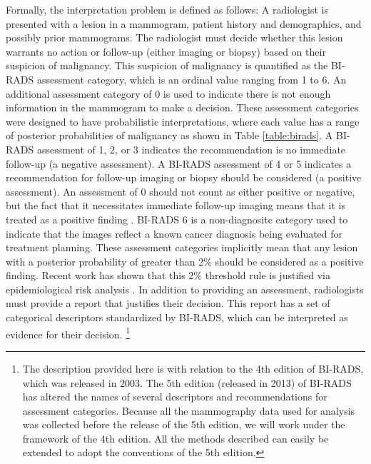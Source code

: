 Formally, the interpretation problem is defined as follows: A radiologist is presented with a lesion in a mammogram, patient history and demographics, and possibly prior mammograms. The radiologist must decide whether this lesion warrants no action or follow-up (either imaging or biopsy) based on their suspicion of malignancy. This suspicion of malignancy is quantified as the BI-RADS assessment category, which is an ordinal value ranging from 1 to 6. An additional assessment category of 0 is used to indicate there is not enough information in the mammogram to make a decision. These assessment categories were designed to have probabilistic interpretations, where each value has a range of posterior probabilities of malignancy as shown in Table \ref{table:birads}. A BI-RADS assessment of 1, 2, or 3 indicates the recommendation is no immediate follow-up (a negative assessment). A BI-RADS assessment of 4 or 5 indicates a recommendation for follow-up imaging or biopsy should be considered (a positive assessment). An assessment of 0 should not count as either positive or negative, but the fact that it necessitates immediate follow-up imaging means that it is treated as a positive finding \cite{Barlow:2004cy}. BI-RADS 6 is a non-diagnositc category used to indicate that the images reflect a known cancer diagnosis being evaluated for treatment planning. These assessment categories implicitly mean that any lesion with a posterior probability of greater than 2\% should be considered as a positive finding. Recent work has shown that this 2\% threshold rule is justified via epidemiological risk analysis \cite{Burnside:2012fk}. In addition to providing an assessment, radiologists must provide a report that justifies their decision. This report has a set of categorical descriptors standardized by BI-RADS, which can be interpreted as evidence for their decision.
\footnote{The description provided here is with relation to the 4th edition of BI-RADS, which was released in 2003. The 5th edition (released in 2013) of BI-RADS has altered the names of several descriptors and recommendations for assessment categories. Because all the mammography data used for analysis was collected before the release of the 5th edition, we will work under the framework of the 4th edition. All the methods described can easily be extended to adopt the conventions of the 5th edition.}

